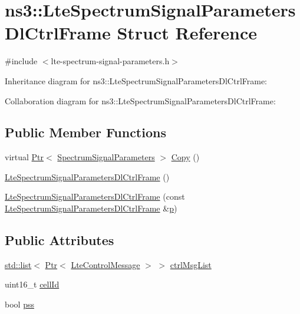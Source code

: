 \hypertarget{structns3_1_1LteSpectrumSignalParametersDlCtrlFrame}{}\section{ns3\+:\+:Lte\+Spectrum\+Signal\+Parameters\+Dl\+Ctrl\+Frame Struct Reference}
\label{structns3_1_1LteSpectrumSignalParametersDlCtrlFrame}


{\ttfamily \#include $<$lte-\/spectrum-\/signal-\/parameters.\+h$>$}



Inheritance diagram for ns3\+:\+:Lte\+Spectrum\+Signal\+Parameters\+Dl\+Ctrl\+Frame\+:


Collaboration diagram for ns3\+:\+:Lte\+Spectrum\+Signal\+Parameters\+Dl\+Ctrl\+Frame\+:
\subsection*{Public Member Functions}
\begin{DoxyCompactItemize}
\item 
virtual \hyperlink{classns3_1_1Ptr}{Ptr}$<$ \hyperlink{structns3_1_1SpectrumSignalParameters}{Spectrum\+Signal\+Parameters} $>$ \hyperlink{structns3_1_1LteSpectrumSignalParametersDlCtrlFrame_a3ed9b8fb9d3322d901391f98fa2281b7}{Copy} ()
\item 
\hyperlink{structns3_1_1LteSpectrumSignalParametersDlCtrlFrame_aeb9c42c11ed7c6f047bab06f1c94f98f}{Lte\+Spectrum\+Signal\+Parameters\+Dl\+Ctrl\+Frame} ()
\item 
\hyperlink{structns3_1_1LteSpectrumSignalParametersDlCtrlFrame_a8848e2786a04740e175fafd5d57d2b69}{Lte\+Spectrum\+Signal\+Parameters\+Dl\+Ctrl\+Frame} (const \hyperlink{structns3_1_1LteSpectrumSignalParametersDlCtrlFrame}{Lte\+Spectrum\+Signal\+Parameters\+Dl\+Ctrl\+Frame} \&\hyperlink{lte__link__budget__x2__handover__measures_8m_ac9de518908a968428863f829398a4e62}{p})
\end{DoxyCompactItemize}
\subsection*{Public Attributes}
\begin{DoxyCompactItemize}
\item 
\hyperlink{openflow-interface_8h_afd9bcfa176617760671b67580f536fa7}{std\+::list}$<$ \hyperlink{classns3_1_1Ptr}{Ptr}$<$ \hyperlink{classns3_1_1LteControlMessage}{Lte\+Control\+Message} $>$ $>$ \hyperlink{structns3_1_1LteSpectrumSignalParametersDlCtrlFrame_a1613baa9c2d4adb03399cdffce07bea6}{ctrl\+Msg\+List}
\item 
uint16\+\_\+t \hyperlink{structns3_1_1LteSpectrumSignalParametersDlCtrlFrame_aa8b05ebed8e2cfa15d5997f630cc22fb}{cell\+Id}
\item 
bool \hyperlink{structns3_1_1LteSpectrumSignalParametersDlCtrlFrame_a84ab593365d0b4df6450e14aa239cbb0}{pss}
\end{DoxyCompactItemize}
